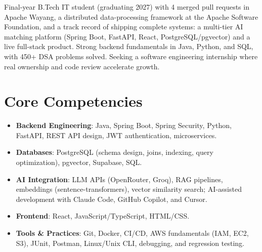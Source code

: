 \documentclass[11pt,a4paper,sans]{moderncv}
\begin{document}
\makecvtitle


\vspace{6pt}
\small{Final-year B.Tech IT student (graduating 2027) with 4 merged pull requests in Apache Wayang, a distributed data-processing framework at the Apache Software Foundation, and a track record of shipping complete systems: a multi-tier AI matching platform (Spring Boot, FastAPI, React, PostgreSQL/pgvector) and a live full-stack product. Strong backend fundamentals in Java, Python, and SQL, with 450+ DSA problems solved. Seeking a software engineering internship where real ownership and code review accelerate growth.}


\section{Core Competencies}
\vspace{1pt}
\begin{itemize}

\item \textbf{Backend Engineering}: Java, Spring Boot, Spring Security, Python, FastAPI, REST API design, JWT authentication, microservices.

\item \textbf{Databases}: PostgreSQL (schema design, joins, indexing, query optimization), pgvector, Supabase, SQL.

\item \textbf{AI Integration}: LLM APIs (OpenRouter, Groq), RAG pipelines, embeddings (sentence-transformers), vector similarity search; AI-assisted development with Claude Code, GitHub Copilot, and Cursor.

\item \textbf{Frontend}: React, JavaScript/TypeScript, HTML/CSS.

\item \textbf{Tools \& Practices}: Git, Docker, CI/CD, AWS fundamentals (IAM, EC2, S3), JUnit, Postman, Linux/Unix CLI, debugging, and regression testing.

\end{itemize}

\end{document}
